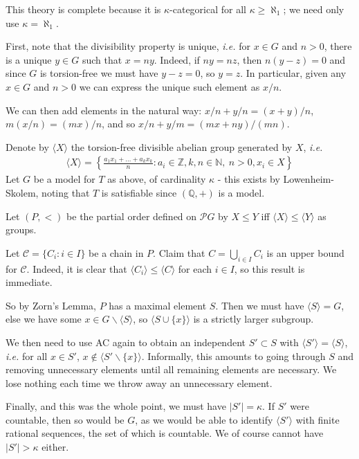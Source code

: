 \documentclass[]{article}
\theoremstyle{custhm}
\theoremstyle{cusdef}
\theoremstyle{custhm}
\theoremstyle{custhm}
\theoremstyle{custhm}
\theoremstyle{custhm}
\theoremstyle{cusdef}
\theoremstyle{remark}
\newcommand{\Z}{\mathbb{Z}}
\newcommand{\Q}{\mathbb{Q}}
\renewcommand{\it}[1]{\textit{#1}}
\begin{document}
This theory is complete because it is $\kappa$-categorical for all $\kappa \ge \aleph_1$; we need only use $\kappa = \aleph_1$.

First, note that the divisibility property is unique, \it{i.e.} for $x\in G$ and $n > 0$, there is a unique $y\in G$ such that $x = ny$. Indeed, if $ny = nz$, then $n(y-z) = 0$ and since $G$ is torsion-free we must have $y-z = 0$, so $y = z$. In particular, given any $x\in G$ and $n > 0$ we can express the unique such element as $x/n$.

We can then add elements in the natural way: $x/n + y/n = (x+y)/n$, $m(x/n) = (mx)/n$, and so $x/n+y/m = (mx+ny)/(mn)$.

Denote by $\langle X\rangle$ the torsion-free divisible abelian group generated by $X$, \it{i.e.}
\begin{align*}
\langle X\rangle = \left\lbrace \frac{a_1x_1+\dots+a_kx_k}{n}: a_i\in\Z,k,n\in \mathbb{N},\ n>0,x_i\in X\right\rbrace
\end{align*}
Let $G$ be a model for $T$ as above, of cardinality $\kappa$ - this exists by Lowenheim-Skolem, noting that $T$ is satisfiable since $(\Q,+)$ is a model.

Let $(P,<)$ be the partial order defined on $\mathcal{P}G$ by $X \le Y$ iff $\langle X\rangle \le \langle Y \rangle$ as groups.

Let $\mathcal{C} = \{C_i:i\in I\}$ be a chain in $P$. Claim that $C = \bigcup_{i\in I}C_i$ is an upper bound for $\mathcal{C}$. Indeed, it is clear that $\langle C_i\rangle \le \langle C\rangle$ for each $i\in I$, so this result is immediate.

So by Zorn's Lemma, $P$ has a maximal element $S$. Then we must have $\langle S\rangle = G$, else we have some $x\in G\backslash \langle S\rangle$, so $\langle S\cup\{x\}\rangle$ is a strictly larger subgroup.

We then need to use AC again to obtain an independent $S'\subset S$ with $\langle S' \rangle = \langle S\rangle$, \it{i.e.} for all $x\in S'$, $x\not\in \langle S'\backslash\{x\}\rangle$. Informally, this amounts to going through $S$ and removing unnecessary elements until all remaining elements are necessary. We lose nothing each time we throw away an unnecessary element.

Finally, and this was the whole point, we must have $|S'| = \kappa$. If $S'$ were countable, then so would be $G$, as we would be able to identify $\langle S'\rangle$ with finite rational sequences, the set of which is countable. We of course cannot have $|S'| > \kappa$ either.
\end{document}
